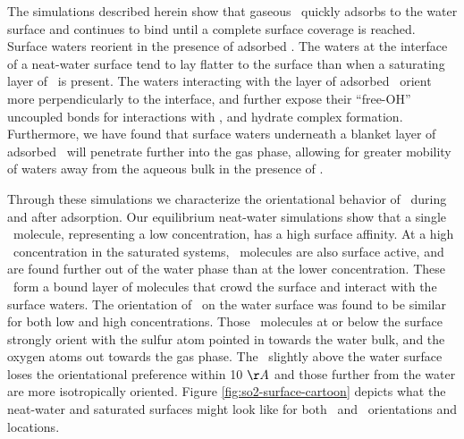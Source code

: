 The simulations described herein show that gaseous \suldiox~quickly adsorbs to the water surface and continues to bind until a complete surface coverage is reached. Surface waters reorient in the presence of adsorbed \suldiox. The waters at the interface of a neat-water surface tend to lay flatter to the surface than when a saturating layer of \suldiox~is present. The waters interacting with the layer of adsorbed \suldiox~orient more perpendicularly to the interface, and further expose their ``free-OH'' uncoupled bonds for interactions with \suldiox, and hydrate complex formation. Furthermore, we have found that surface waters underneath a blanket layer of adsorbed \suldiox~will penetrate further into the gas phase, allowing for greater mobility of waters away from the aqueous bulk in the presence of \suldiox.

Through these simulations we characterize the orientational behavior of \suldiox~during and after adsorption. Our equilibrium neat-water simulations show that a single \suldiox~molecule, representing a low concentration, has a high surface affinity. At a high \suldiox~concentration in the saturated systems, \suldiox~molecules are also surface active, and are found further out of the water phase than at the lower concentration. These \suldiox~form a bound layer of molecules that crowd the surface and interact with the surface waters. The orientation of \suldiox~on the water surface was found to be similar for both low and high concentrations. Those \suldiox~molecules at or below the surface strongly orient with the sulfur atom pointed in towards the water bulk, and the oxygen atoms out towards the gas phase. The \suldiox~slightly above the water surface loses the orientational preference within 10 $\AA$ and those further from the water are more isotropically oriented. Figure \ref{fig:so2-surface-cartoon} depicts what the neat-water and saturated surfaces might look like for both \suldiox~and \wat~orientations and locations.

